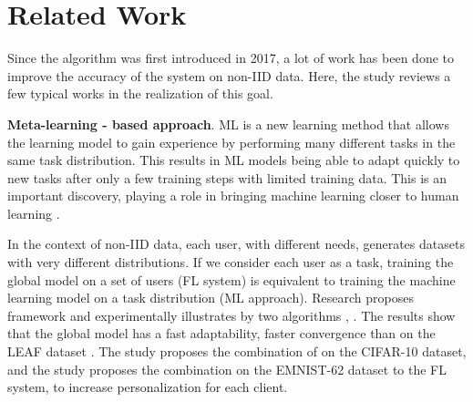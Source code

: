 \documentclass[runningheads]{llncs}
\begin{document}
\section{Related Work}

Since the  algorithm was first introduced in 2017, a lot of work has been done to improve the accuracy of the system on non-IID data. Here, the study reviews a few typical works in the realization of this goal.



\textbf{Meta-learning - based approach}. ML is a new learning method that allows the learning model to gain experience by performing many different tasks in the same task distribution. This results in ML models being able to adapt quickly to new tasks after only a few training steps with limited training data. This is an important discovery, playing a role in bringing machine learning closer to human learning \cite{harlow1949formation}.


In the context of non-IID data, each user, with different needs, generates datasets with very different distributions. If we consider each user as a task, training the global model on a set of users (FL system) is equivalent to training the machine learning model on a task distribution (ML approach). Research \cite{chen2018federated} proposes framework  and experimentally illustrates by two algorithms , . The results show that the global model has a fast adaptability, faster convergence than  on the LEAF dataset \cite{caldas2018leaf}. The study \cite{fallah2020personalized} proposes the combination of  on the CIFAR-10 dataset, and the study \cite{jiang2019improving} proposes the combination  \cite{nichol2018first} on the EMNIST-62 dataset \cite{cohen2017emnist} to the FL system, to increase personalization for each client.
\end{document}
